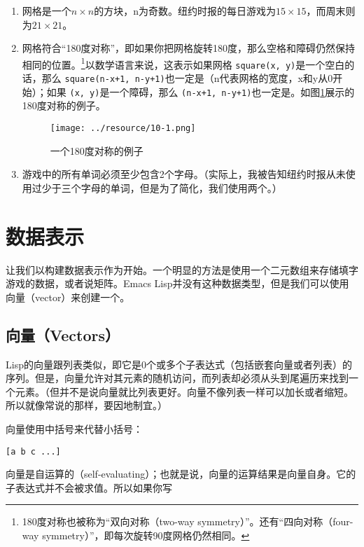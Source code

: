 \begin{enumerate}
  \item 网格是一个$n \times n$的方块，n为奇数。纽约时报的每日游戏为$15 \times 15$，而周末则为$21 \times 21$。
  \item 网格符合“180度对称”，即如果你把网格旋转180度，那么空格和障碍仍然保持相同的位置。\footnote{180度对称也被称为“双向对称（two-way symmetry）”。还有“四向对称（four-way symmetry）”，即每次旋转90度网格仍然相同。}以数学语言来说，这表示如果网格 \texttt{square(x, y)}是一个空白的话，那么 \texttt{square(n-x+1, n-y+1)}也一定是（n代表网格的宽度，x和y从0开始）；如果 \texttt{(x, y)}是一个障碍，那么 \texttt{(n-x+1, n-y+1)}也一定是。如图\ref{figure:an-example-of-180-symmetry}展示的180度对称的例子。
    \begin{figure}[hbt!]
      \texttt{[image: ../resource/10-1.png]}
      \caption{一个180度对称的例子}
      \label{figure:an-example-of-180-symmetry}
    \end{figure}
  \item 游戏中的所有单词必须至少包含2个字母。（实际上，我被告知纽约时报从未使用过少于三个字母的单词，但是为了简化，我们使用两个。）
\end{enumerate}

\section{数据表示}
\label{section:10-Data-Representation}

让我们以构建数据表示作为开始。一个明显的方法是使用一个二元数组来存储填字游戏的数据，或者说矩阵。Emacs Lisp并没有这种数据类型，但是我们可以使用向量（vector）来创建一个。

\subsection{向量（Vectors）}
\label{section:10-Vectors}

Lisp的向量跟列表类似，即它是0个或多个子表达式（包括嵌套向量或者列表）的序列。但是，向量允许对其元素的随机访问，而列表却必须从头到尾遍历来找到一个元素。（但并不是说向量就比列表更好。向量不像列表一样可以加长或者缩短。所以就像常说的那样，要因地制宜。）

向量使用中括号来代替小括号：

\begin{verbatim}
[a b c ...]
\end{verbatim}

向量是自运算的（self-evaluating）；也就是说，向量的运算结果是向量自身。它的子表达式并不会被求值。所以如果你写

